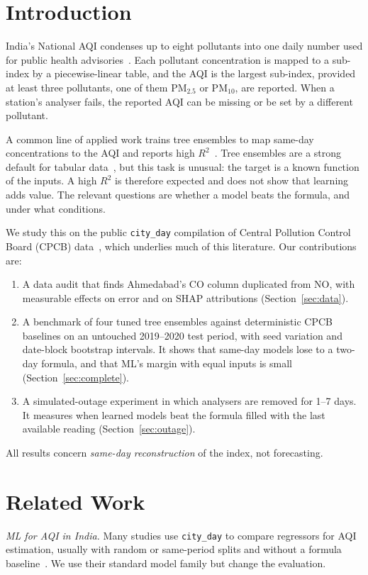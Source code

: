 \documentclass[conference]{IEEEtran}
\begin{document}
\section{Introduction}
India's National AQI condenses up to eight pollutants into one daily number used for public
health advisories~\cite{cpcb2014}. Each pollutant concentration is mapped to a sub-index by a
piecewise-linear table, and the AQI is the largest sub-index, provided at least three
pollutants, one of them PM$_{2.5}$ or PM$_{10}$, are reported. When a station's analyser fails,
the reported AQI can be missing or be set by a different pollutant.

A common line of applied work trains tree ensembles to map same-day concentrations to the
AQI and reports high $R^2$~\cite{kumar2023indian,natarajan2024optimized}. Tree ensembles are a
strong default for tabular data~\cite{grinsztajn2022tree,shwartz2022tabular}, but this task is
unusual: the target is a known function of the inputs. A high $R^2$ is therefore expected and
does not show that learning adds value. The relevant questions are whether a model beats the
formula, and under what conditions.

We study this on the public \texttt{city\_day} compilation of Central Pollution Control Board
(CPCB) data~\cite{rao2020kaggle}, which underlies much of this literature. Our contributions are:
\begin{enumerate}
\item A data audit that finds Ahmedabad's CO column duplicated from NO, with measurable
effects on error and on SHAP attributions (Section~\ref{sec:data}).
\item A benchmark of four tuned tree ensembles against deterministic CPCB baselines on an
untouched 2019--2020 test period, with seed variation and date-block bootstrap intervals.
It shows that same-day models lose to a two-day formula, and that ML's margin with
equal inputs is small (Section~\ref{sec:complete}).
\item A simulated-outage experiment in which analysers are removed for 1--7 days. It
measures when learned models beat the formula filled with the last available reading
(Section~\ref{sec:outage}).
\end{enumerate}
All results concern \emph{same-day reconstruction} of the index, not forecasting.

\section{Related Work}
\textit{ML for AQI in India.} Many studies use \texttt{city\_day} to compare regressors for
AQI estimation, usually with random or same-period splits and without a formula
baseline~\cite{kumar2023indian,natarajan2024optimized}. We use their standard model family
\cite{breiman2001,chen2016xgboost,ke2017lightgbm,prokhorenkova2018catboost} but change the
evaluation.
\end{document}
